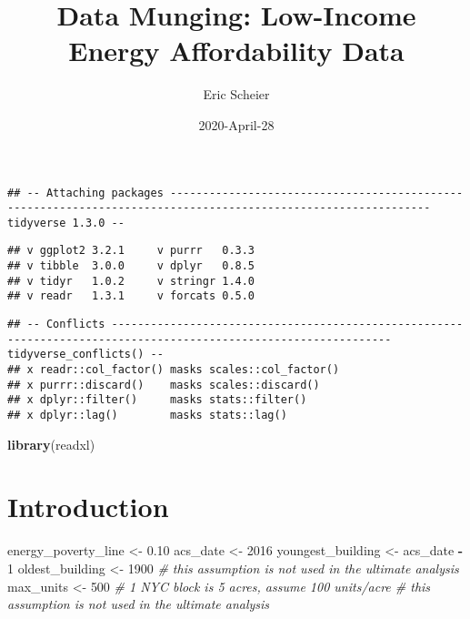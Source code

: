 \documentclass[]{article}
\title{Data Munging: Low-Income Energy Affordability Data}
\author{Eric Scheier}
\date{2020-April-28}
\newenvironment{Shaded}{\begin{snugshade}}{\end{snugshade}}
\newcommand{\CommentTok}[1]{\textcolor[rgb]{0.56,0.35,0.01}{\textit{#1}}}
\newcommand{\DataTypeTok}[1]{\textcolor[rgb]{0.13,0.29,0.53}{#1}}
\newcommand{\DecValTok}[1]{\textcolor[rgb]{0.00,0.00,0.81}{#1}}
\newcommand{\FloatTok}[1]{\textcolor[rgb]{0.00,0.00,0.81}{#1}}
\newcommand{\KeywordTok}[1]{\textcolor[rgb]{0.13,0.29,0.53}{\textbf{#1}}}
\newcommand{\NormalTok}[1]{#1}
\newcommand{\OperatorTok}[1]{\textcolor[rgb]{0.81,0.36,0.00}{\textbf{#1}}}
\newcommand{\OtherTok}[1]{\textcolor[rgb]{0.56,0.35,0.01}{#1}}
\newcommand{\StringTok}[1]{\textcolor[rgb]{0.31,0.60,0.02}{#1}}
\begin{document}
\maketitle

\begin{Shaded}
\end{Shaded}

\begin{verbatim}
## -- Attaching packages -------------------------------------------------------------------------------------------------------------- tidyverse 1.3.0 --
\end{verbatim}

\begin{verbatim}
## v ggplot2 3.2.1     v purrr   0.3.3
## v tibble  3.0.0     v dplyr   0.8.5
## v tidyr   1.0.2     v stringr 1.4.0
## v readr   1.3.1     v forcats 0.5.0
\end{verbatim}

\begin{verbatim}
## -- Conflicts ----------------------------------------------------------------------------------------------------------------- tidyverse_conflicts() --
## x readr::col_factor() masks scales::col_factor()
## x purrr::discard()    masks scales::discard()
## x dplyr::filter()     masks stats::filter()
## x dplyr::lag()        masks stats::lag()
\end{verbatim}

\begin{Shaded}
\begin{Highlighting}[]
\KeywordTok{library}\NormalTok{(readxl)}
\end{Highlighting}
\end{Shaded}

\hypertarget{introduction}{%
\section{Introduction}\label{introduction}}

\begin{Shaded}
\begin{Highlighting}[]
\NormalTok{energy_poverty_line <-}\StringTok{ }\FloatTok{0.10}
\NormalTok{acs_date <-}\StringTok{ }\DecValTok{2016}
\NormalTok{youngest_building <-}\StringTok{ }\NormalTok{acs_date }\OperatorTok{-}\StringTok{ }\DecValTok{1}
\NormalTok{oldest_building <-}\StringTok{ }\DecValTok{1900} \CommentTok{# this assumption is not used in the ultimate analysis}
\NormalTok{max_units <-}\StringTok{ }\DecValTok{500} \CommentTok{# 1 NYC block is 5 acres, assume 100 units/acre # this assumption is not used in the ultimate analysis}
\end{Highlighting}
\end{Shaded}
\end{document}
